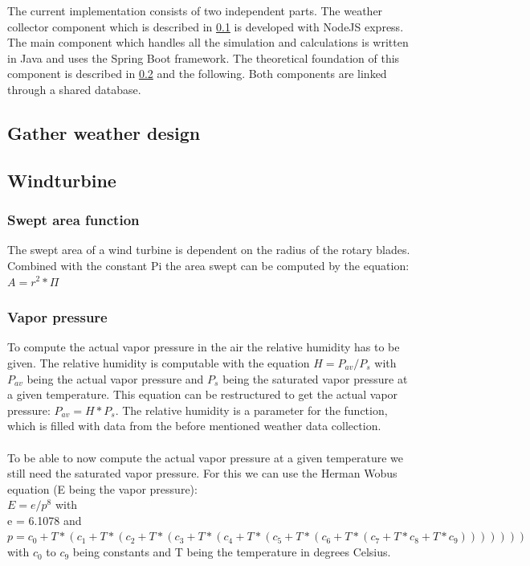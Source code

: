 The current implementation consists of two independent parts. The weather collector component which is described in \cref{subsec:weather} is developed with  NodeJS express. The main component which handles all the simulation and calculations is written in Java and uses the Spring Boot framework. The theoretical foundation of this component is described in \cref{subsec:Windturbine} and the following. Both components are linked through a shared database.

\subsection{Gather weather design}\label{subsec:weather}


\subsection{Windturbine}\label{subsec:Windturbine}
\subsubsection{Swept area function}
The swept area of a wind turbine is dependent on the radius of the rotary blades. Combined with the constant Pi the area swept can be computed by the equation\cite{Beckmann}: $A = r^{2}* \Pi  $
\subsubsection{Vapor pressure}
To compute the actual vapor pressure in the air the relative humidity has to be given. The relative humidity is computable with the equation $H = P_{av} / P_s$ with $P_{av}$ being the actual vapor pressure and $P_s$ being the saturated vapor pressure at a given temperature. This equation can be restructured to get the actual vapor pressure: $P_{av}  = H * P_s$. The relative humidity is a parameter for the function, which is filled with data from the before mentioned weather data collection.\\
\\
To be able to now compute the actual vapor pressure at a given temperature we still need the saturated vapor pressure. For this we can use the Herman Wobus equation (E being the vapor pressure):\\
$E = e/p^{8}$ with\\
e = 6.1078 and\\
$p = c_0 + T * (c_1 + T * (c_2 + T * (c_3 + T * (c_4 + T *(c_5 + T * (c_6 + T * (c_7 + T * c_8 + T * c_9)))))))$\\
with $c_0$ to $c_9$ being constants and T being the temperature in degrees Celsius\cite{AirDensity,NOAA}.
